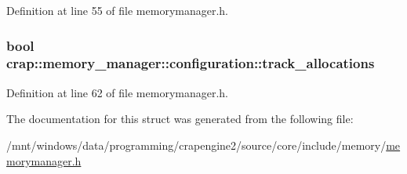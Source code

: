 Definition at line 55 of file memorymanager.\+h.

\hypertarget{structcrap_1_1memory__manager_1_1configuration_a1e65aab18541fd1200bc32e344de79f7}{}
\subsubsection[{track\+\_\+allocations}]{\setlength{\rightskip}{0pt plus 5cm}bool crap\+::memory\+\_\+manager\+::configuration\+::track\+\_\+allocations}\label{structcrap_1_1memory__manager_1_1configuration_a1e65aab18541fd1200bc32e344de79f7}


Definition at line 62 of file memorymanager.\+h.



The documentation for this struct was generated from the following file\+:\begin{DoxyCompactItemize}
\item 
/mnt/windows/data/programming/crapengine2/source/core/include/memory/\hyperlink{memorymanager_8h}{memorymanager.\+h}\end{DoxyCompactItemize}
